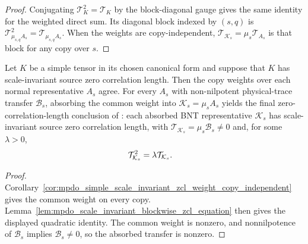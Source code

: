 \begin{proof}\leanok
    Conjugating $\mathcal T_K^2=\mathcal T_K$ by the block-diagonal gauge
    gives the same identity for the weighted direct sum. Its diagonal block
    indexed by $(s,q)$ is
    $\mathcal T_{\mu_{s,q}A_s}^{2}
        =\mathcal T_{\mu_{s,q}A_s}$.
    When the weights are copy-independent,
    $\mathcal T_{\mathcal K_s}=\mu_s\mathcal T_{A_s}$ is that block for any
    copy over $s$.
\end{proof}

\begin{lemma}
    \label{thm:mpdo_absorbed_bnt_sector_zcl}
    \leanok
    Let $K$ be a simple tensor in its chosen canonical form and suppose that
    $K$ has scale-invariant source zero correlation length. Then the copy
    weights over each normal representative $A_s$ agree. For every $A_s$ with
    non-nilpotent physical-trace transfer $\mathcal B_s$, absorbing the common
    weight into $\mathcal K_s=\mu_sA_s$ yields the final
    zero-correlation-length conclusion of
    \cite[Appendix~C.2, line~1781]{Cirac2016MPDO_arXiv}: each absorbed BNT
    representative $\mathcal K_s$ has scale-invariant source zero correlation
    length, with $\mathcal T_{\mathcal K_s}=\mu_s\mathcal B_s\ne0$ and, for
    some $\lambda>0$,
    \begin{align}
        \mathcal T_{\mathcal K_s}^{2}
         & =\lambda\mathcal T_{\mathcal K_s}.
        \notag
    \end{align}
\end{lemma}

\begin{proof}\leanok
    Corollary~\ref{cor:mpdo_simple_scale_invariant_zcl_weight_copy_independent}
    gives the common weight on every copy.
    Lemma~\ref{lem:mpdo_scale_invariant_blockwise_zcl_equation} then gives
    the displayed quadratic identity. The common weight is nonzero, and
    nonnilpotence of $\mathcal B_s$ implies $\mathcal B_s\ne0$, so the
    absorbed transfer is nonzero.
\end{proof}


